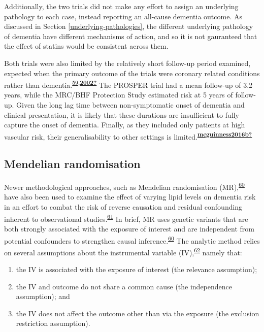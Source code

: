 \documentclass[a4paper, twoside]{templates/ociamthesis}
\providecommand{\tightlist}{%
  \setlength{\itemsep}{0pt}\setlength{\parskip}{0pt}}
\begin{document}
Additionally, the two trials did not make any effort to assign an underlying pathology to each case, instead reporting an all-cause dementia outcome. As discussed in Section \ref{underlying-pathologies}, the different underlying pathology of dementia have different mechanisms of action, and so it is not gauranteed that the effect of statins would be consistent across them.

Both trials were also limited by the relatively short follow-up period examined, expected when the primary outcome of the trials were coronary related conditions rather than dementia.\textsuperscript{\protect\hyperlink{ref-trompet2010}{59},\protect\hyperlink{ref-2002}{\textbf{2002?}}} The PROSPER trial had a mean follow-up of 3.2 years, while the MRC/BHF Protection Study estimated risk at 5 years of follow-up. Given the long lag time between non-symptomatic onset of dementia and clinical presentation, it is likely that these durations are insufficient to fully capture the onset of dementia. Finally, as they included only patients at high vascular risk, their generalisability to other settings is limited.\textsuperscript{\protect\hyperlink{ref-mcguinness2016b}{\textbf{mcguinness2016b?}}}

\hypertarget{mendelian-randomisation}{%
\subsection{Mendelian randomisation}\label{mendelian-randomisation}}

Newer methodological approaches, such as Mendelian randomisation (MR),\textsuperscript{\protect\hyperlink{ref-daveysmith2014}{60}} have also been used to examine the effect of varying lipid levels on dementia risk in an effort to combat the risk of reverse causation and residual confounding inherent to observational studies.\textsuperscript{\protect\hyperlink{ref-greenland2000}{61}} In brief, MR uses genetic variants that are both strongly associated with the exposure of interest and are independent from potential confounders to strengthen causal inference.\textsuperscript{\protect\hyperlink{ref-daveysmith2014}{60}} The analytic method relies on several assumptions about the instrumental variable (IV),\textsuperscript{\protect\hyperlink{ref-davies2018}{62}} namely that:

\begin{enumerate}
\def\labelenumi{\arabic{enumi}.}
\tightlist
\item
  the IV is associated with the exposure of interest (the relevance assumption);
\item
  the IV and outcome do not share a common cause (the independence assumption); and
\item
  the IV does not affect the outcome other than via the exposure (the exclusion restriction assumption).
\end{enumerate}
\end{document}

